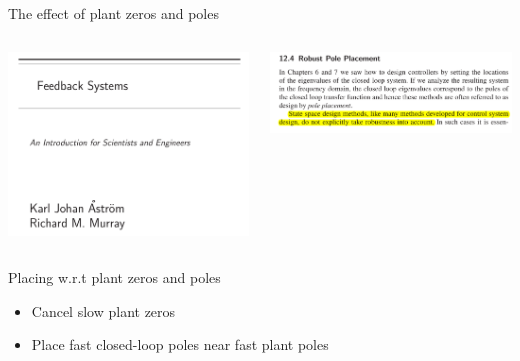 \documentclass[presentation,aspectratio=1610]{beamer}
\begin{document}
\begin{frame}[label={sec:org6b19ed2}]{The effect of plant zeros and poles}
\begin{columns}
\begin{column}{0.4\columnwidth}
\begin{center}
 \includegraphics[width=1.0\linewidth]{../../figures/AM-portal.png}
\end{center}

\pause
\end{column}

\begin{column}{0.6\columnwidth}
\begin{center}
 \includegraphics[width=1.0\linewidth]{../../figures/AM-ch12.4.png}
\end{center}
\end{column}
\end{columns}
\end{frame}


\begin{frame}[label={sec:orga0e6da5}]{Placing w.r.t plant zeros and poles}
\begin{itemize}
\item Cancel slow plant zeros
\item Place fast closed-loop poles near fast plant poles
\end{itemize}
\end{frame}
\end{document}
